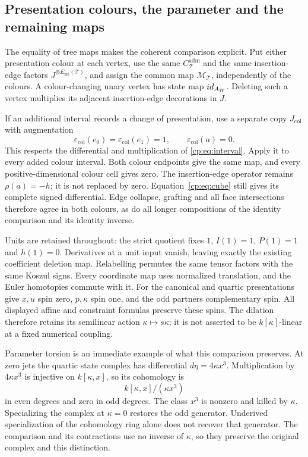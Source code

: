 \subsection{Presentation colours, the parameter and the remaining maps}

The equality of tree maps makes the coherent comparison explicit.
Put either presentation colour at each vertex, use the same
\(C_{\mathcal T}^{\mathrm{adm}}\) and the same insertion-edge
factors \(J^{\otimes E_{\mathrm{int}}(\mathcal T)}\), and assign
the common map \(\mathcal M_{\mathcal T}\), independently of
the colours.  A colour-changing unary vertex has state map
\(id_{A_W}\).  Deleting such a vertex multiplies its adjacent
insertion-edge decorations in \(J\).

If an additional interval records a change of presentation, use a
separate copy \(J_{\mathrm{col}}\) with augmentation
\[
 \varepsilon_{\mathrm{col}}(e_0)
   =\varepsilon_{\mathrm{col}}(e_1)=1,\qquad
 \varepsilon_{\mathrm{col}}(a)=0.
\]
This respects the differential and multiplication of
\eqref{cp:eq:interval}.  Apply it to every added colour interval.
Both colour endpoints give the same map, and every positive-dimensional
colour cell gives zero.  The insertion-edge operator remains
\(\rho(a)=-h\); it is not replaced by zero.
Equation~\eqref{cp:eq:cube} still gives its complete signed
differential.  Edge collapse, grafting and all face intersections
therefore agree in both colours, as do all longer compositions of
the identity comparison and its identity inverse.

Units are retained throughout: the strict quotient fixes \(1\),
\(I(1)=1\), \(P(1)=1\) and \(h(1)=0\).
Derivatives at a unit input vanish, leaving exactly the existing
coefficient deletion map.  Relabelling permutes the same tensor
factors with the same Koszul signs.  Every coordinate map uses
normalized translation, and the Euler homotopies commute with it.
For the canonical and quartic presentations give \(x,u\) spin zero,
\(p,\kappa\) spin one, and the odd partners complementary spin.
All displayed affine and constraint formulas preserve these spins.
The dilation therefore retains its semilinear action
\(\kappa\mapsto s\kappa\); it is not asserted to be
\(k[\kappa]\)-linear at a fixed numerical coupling.

Parameter torsion is an immediate example of what this comparison
preserves.  At zero jets the quartic state complex has differential
\(d\eta=4\kappa x^3\).  Multiplication by \(4\kappa x^3\)
is injective on \(k[\kappa,x]\), so its cohomology is
\[
 k[\kappa,x]/(\kappa x^3)
\]
in even degrees and zero in odd degrees.
The class \(x^3\) is nonzero and killed by \(\kappa\).
Specializing the complex at \(\kappa=0\) restores the odd
generator.  Underived specialization of the cohomology ring alone
does not recover that generator.  The comparison and its contractions
use no inverse of \(\kappa\), so they preserve the original complex
and this distinction.

